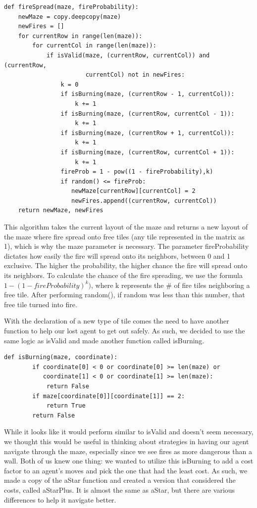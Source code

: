 \documentclass[11pt]{article}
\begin{document}
\begin{verbatim}
def fireSpread(maze, fireProbability):
    newMaze = copy.deepcopy(maze)
    newFires = []
    for currentRow in range(len(maze)):
        for currentCol in range(len(maze)):
            if isValid(maze, (currentRow, currentCol)) and (currentRow,
                       currentCol) not in newFires:
                k = 0
                if isBurning(maze, (currentRow - 1, currentCol)):
                    k += 1
                if isBurning(maze, (currentRow, currentCol - 1)):
                    k += 1
                if isBurning(maze, (currentRow + 1, currentCol)):
                    k += 1
                if isBurning(maze, (currentRow, currentCol + 1)):
                    k += 1
                fireProb = 1 - pow((1 - fireProbability),k)
                if random() <= fireProb:
                   newMaze[currentRow][currentCol] = 2
                   newFires.append((currentRow, currentCol))
    return newMaze, newFires
\end{verbatim}

This algorithm takes the current layout of the maze and returns a new layout of the maze where fire spread onto free tiles (any tile represented in the matrix as 1), which is why the maze parameter is necessary. The parameter fireProbability dictates how easily the fire will spread onto its neighbors, between 0 and 1 exclusive. The higher the probability, the higher chance the fire will spread onto its neighbors. To calculate the chance of the fire spreading, we use the formula $1 - (1 - fireProbability)^k)$, where k represents the \# of fire tiles neighboring a free tile. After performing random(), if random was less than this number, that free tile turned into fire.

With the declaration of a new type of tile comes the need to have another function to help our lost agent to get out safely. As such, we decided to use the same logic as isValid and made another function called isBurning.

\begin{verbatim}
def isBurning(maze, coordinate):
        if coordinate[0] < 0 or coordinate[0] >= len(maze) or 
           coordinate[1] < 0 or coordinate[1] >= len(maze):
            return False
        if maze[coordinate[0]][coordinate[1]] == 2:
            return True
        return False
\end{verbatim}

While it looks like it would perform similar to isValid and doesn't seem necessary, we thought this would be useful in thinking about strategies in having our agent navigate through the maze, especially since we see fires as more dangerous than a wall. Both of us knew one thing: we wanted to utilize this isBurning to add a cost factor to an agent's moves and pick the one that had the least cost. As such, we made a copy of the aStar function and created a version that considered the costs, called aStarPlus. It is almost the same as aStar, but there are various differences to help it navigate better.
\end{document}
